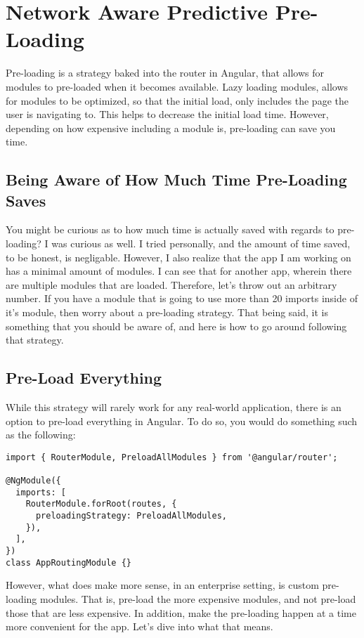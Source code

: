 \chapter{ Network Aware Predictive Pre-Loading }

Pre-loading is a strategy baked into the router in Angular, that allows for
modules to pre-loaded when it becomes available. Lazy loading modules, allows 
for modules to be optimized, so that the initial load, only includes the page 
the user is navigating to. This helps to decrease the initial load time. 
However, depending on how expensive including a module is, pre-loading can
save you time. 

\section{ Being Aware of How Much Time Pre-Loading Saves }
You might be curious as to how much time is actually saved with regards to 
pre-loading? I was curious as well. I tried personally, and the amount of 
time saved, to be honest, is negligable. However, I also realize that the 
app I am working on has a minimal amount of modules. I can see that for 
another app, wherein there are multiple modules that are loaded. Therefore, 
let's throw out an arbitrary number. If you have a module that is going to 
use more than 20 imports inside of it's module, then worry about a pre-loading 
strategy. That being said, it is something that you should be aware of, and
here is how to go around following that strategy. 

\section{Pre-Load Everything}
While this strategy will rarely work for any real-world application, there is 
an option to pre-load everything in Angular. To do so, you would do something 
such as the following: 
\begin{lstlisting}
import { RouterModule, PreloadAllModules } from '@angular/router';

@NgModule({
  imports: [
    RouterModule.forRoot(routes, {
      preloadingStrategy: PreloadAllModules,
    }),
  ],
})
class AppRoutingModule {}
\end{lstlisting}

However, what does make more sense, in an enterprise setting, is custom pre-loading
modules. That is, pre-load the more expensive modules, and not pre-load those that 
are less expensive. In addition, make the pre-loading happen at a time more 
convenient for the app. Let's dive into what that means.

